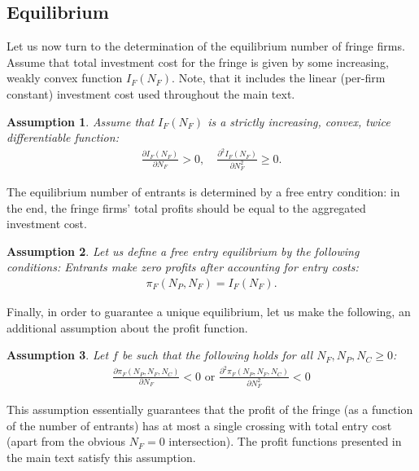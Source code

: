 \documentclass[a4paper]{article}
\newtheorem{assumption}{Assumption}
\begin{document}
\subsection{Equilibrium}
\label{sec:more_general_equilibrium}

Let us now turn to the determination of the equilibrium number of fringe firms.
Assume that total investment cost for the fringe is given by some increasing, weakly convex function $I_F(N_F)$.
Note, that it includes the linear (per-firm constant) investment cost used throughout the main text.
\begin{assumption}
    Assume that $I_F(N_F)$ is a strictly increasing, convex, twice differentiable function:
    \begin{align*}
        \frac{\partial I_F(N_F)}{\partial N_F} > 0, \quad \frac{\partial^2 I_F(N_F)}{\partial N_F^2} \geq 0.
    \end{align*}
\end{assumption}

The equilibrium number of entrants is determined by a free entry condition: in the end, the fringe firms' total profits should be equal to the aggregated investment cost.
\begin{assumption}
    \label{ass:free_entry}
    Let us define a free entry equilibrium by the following conditions: Entrants make zero profits after accounting for entry costs: 
    \begin{align*}
        \pi_F(N_P, N_F) = I_F(N_F).
    \end{align*}
\end{assumption}

Finally, in order to guarantee a unique equilibrium, let us make the following, an additional assumption about the profit function.
\begin{assumption}
    \label{ass:single_crossing}
    Let $f$ be such that the following holds for all $N_F, N_P, N_C \geq 0$:
    \begin{align*}
        \frac{\partial \pi_F(N_P, N_F, N_C)}{\partial N_F} < 0 \text{ or } \frac{\partial^2 \pi_F(N_P, N_F, N_C)}{\partial N_F^2} < 0
    \end{align*}
\end{assumption}
This assumption essentially guarantees that the profit of the fringe (as a function of the number of entrants) has at most a single crossing with total entry cost (apart from the obvious $N_F=0$ intersection).
The profit functions presented in the main text satisfy this assumption.
\end{document}
